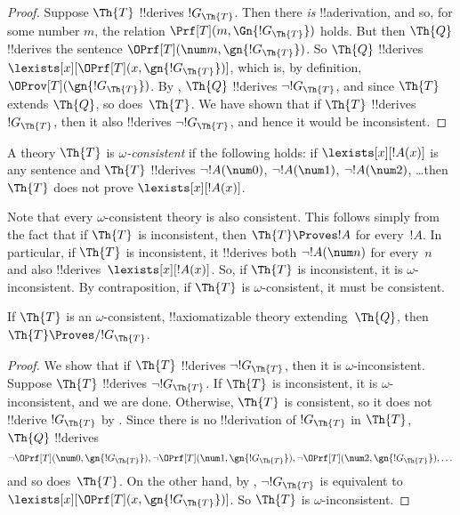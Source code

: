 \documentclass[../../../include/open-logic-section]{subfiles}
\begin{document}
\begin{proof}
Suppose $\Th{T}$ !!{derive}s $!G_\Th{T}$. Then there \emph{is}
!!a{derivation}, and so, for some number $m$, the relation $\Prf[T](m,
\Gn{!G_\Th{T}})$ holds. But then $\Th{Q}$ !!{derive}s the sentence
$\OPrf[T](\num m, \gn{!G_\Th{T}})$. So $\Th{Q}$ !!{derive}s
$\lexists[x][\OPrf[T](x,\gn{!G_\Th{T}})]$, which is, by definition,
$\OProv[T](\gn{!G_\Th{T}})$. By , $\Th{Q}$ !!{derive}s
$\lnot !G_\Th{T}$, and since $\Th{T}$ extends $\Th{Q}$, so
does~$\Th{T}$. We have shown that if $\Th{T}$ !!{derive}s $!G_\Th{T}$, then
it also !!{derive}s $\lnot !G_\Th{T}$, and hence it would be inconsistent.
\end{proof}

\begin{defn}
A theory $\Th{T}$ is \emph{$\omega$-consistent} if the following holds: if
$\lexists[x][!A(x)]$ is any sentence and $\Th{T}$ !!{derive}s $\lnot
!A(\num 0)$, $\lnot !A(\num 1)$, $\lnot !A(\num 2)$, \dots then $\Th{T}$
does not prove $\lexists[x][!A(x)]$.
\end{defn}

Note that every $\omega$-consistent theory is also consistent. This
follows simply from the fact that if $\Th{T}$ is inconsistent, then
$\Th{T} \Proves !A$ for every~$!A$. In particular, if $\Th{T}$ is
inconsistent, it !!{derive}s both $\lnot !A(\num n)$ for every~$n$ and
also !!{derive}s~$\lexists[x][!A(x)]$. So, if $\Th{T}$ is
inconsistent, it is $\omega$-inconsistent. By contraposition, if
$\Th{T}$ is $\omega$-consistent, it must be consistent.

\begin{lem}
If $\Th{T}$ is an $\omega$-consistent, !!{axiomatizable} theory
extending~$\Th{Q}$, then $\Th{T} \Proves/ !G_\Th{T}$.
\end{lem}

\begin{proof}
We show that if $\Th{T}$ !!{derive}s $\lnot !G_\Th{T}$, then it is
$\omega$-inconsistent. Suppose $\Th{T}$ !!{derive}s $\lnot !G_\Th{T}$. If
$\Th{T}$ is inconsistent, it is $\omega$-inconsistent, and we are
done. Otherwise, $\Th{T}$ is consistent, so it does not !!{derive}
$!G_\Th{T}$ by . Since there is no
!!{derivation} of $!G_\Th{T}$ in $\Th{T}$, $\Th{Q}$ !!{derive}s
\[
\lnot \OPrf[T](\num 0, \gn{!G_\Th{T}}), \lnot \OPrf[T](\num 1,
\gn{!G_\Th{T}}), \lnot \OPrf[T](\num 2, \gn{!G_\Th{T}}), \dots
\]
and so does~$\Th{T}$.  On the other hand, by , $\lnot
!G_\Th{T}$ is equivalent to
$\lexists[x][\OPrf[T](x,\gn{!G_\Th{T}})]$. So $\Th{T}$ is
$\omega$-inconsistent.
\end{proof}
\end{document}
